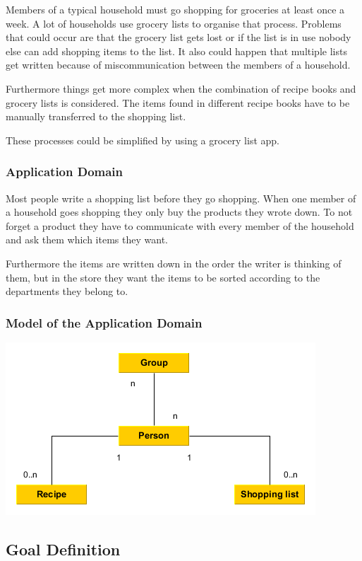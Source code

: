 \documentclass[12pt]{article}
\theoremstyle{definition}
\begin{document}
Members of a typical household must go shopping for groceries at least once a week. A lot of households use grocery lists to organise that process. Problems that could occur are that the grocery list gets lost or if the list is in use nobody else can add shopping items to the list. It also could happen that multiple lists get written because of miscommunication between the members of a household.

Furthermore things get more complex when the combination of recipe books and grocery lists is considered. The items found in different recipe books have to be manually transferred to the shopping list. 

These processes could be simplified by using a grocery list app.

\subsubsection{Application Domain}
Most people write a shopping list before they go shopping. When one member of a household goes shopping they only buy the products they wrote down. To not forget a product they have to communicate with every member of the household and ask them which items they want. 

Furthermore the items are written down in the order the writer is thinking of them, but in the store they want the items to be sorted according to the departments they belong to. 

\subsubsection{Model of the Application Domain}

\includegraphics[scale=.5]{Images/AppDomain.png}

\subsection{Goal Definition}
\end{document}
